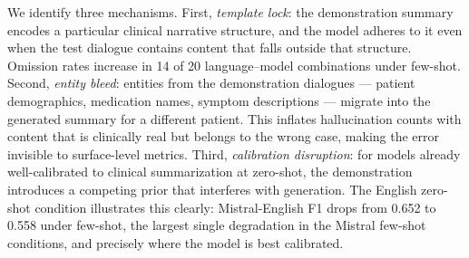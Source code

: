 \documentclass[conference]{IEEEtran}
\begin{document}
\begin{table}[h!]
\centering
\caption{Zero-shot vs.\ few-shot macro-averaged delta.
\textcolor{worstred}{Red}\,=\,degradation;
\textcolor{bestgreen}{green}\,=\,improvement.}
\label{tab:macro_metrics}
\end{table}

We identify three mechanisms. First, \textit{template lock}: the
demonstration summary encodes a particular clinical narrative structure,
and the model adheres to it even when the test dialogue contains content
that falls outside that structure. Omission rates increase in 14 of 20
language--model combinations under few-shot. Second, \textit{entity bleed}:
entities from the demonstration dialogues --- patient demographics,
medication names, symptom descriptions --- migrate into the generated
summary for a different patient. This inflates hallucination counts with
content that is clinically real but belongs to the wrong case, making the
error invisible to surface-level metrics. Third, \textit{calibration
disruption}: for models already well-calibrated to clinical summarization
at zero-shot, the demonstration introduces a competing prior that
interferes with generation. The English zero-shot condition illustrates
this clearly: Mistral-English F1 drops from 0.652 to 0.558 under few-shot,
the largest single degradation in the Mistral few-shot conditions, and
precisely where the model is best calibrated.
\end{document}
